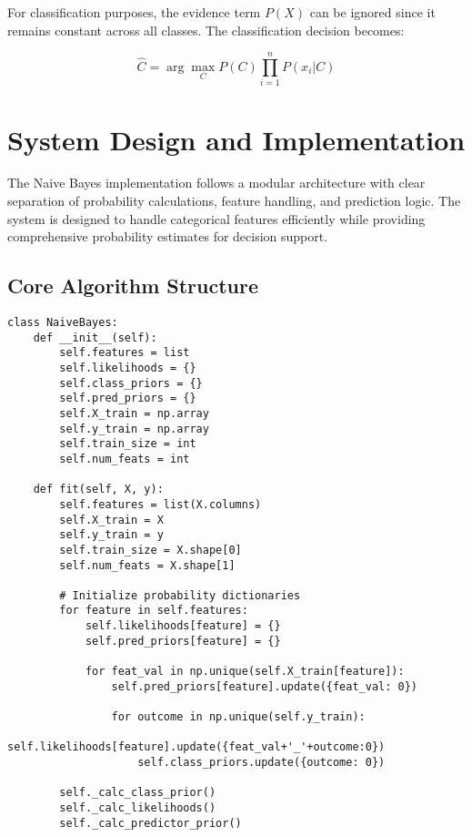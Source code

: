 \documentclass[11pt,a4paper]{article}
\begin{document}
For classification purposes, the evidence term $P(X)$ can be ignored since it remains constant across all classes. The classification decision becomes:

\begin{equation}
\hat{C} = \arg\max_C P(C) \prod_{i=1}^{n} P(x_i|C)
\end{equation}

\section{System Design and Implementation}

The Naive Bayes implementation follows a modular architecture with clear separation of probability calculations, feature handling, and prediction logic. The system is designed to handle categorical features efficiently while providing comprehensive probability estimates for decision support.

\subsection{Core Algorithm Structure}

\begin{lstlisting}[caption=Naive Bayes Class Implementation]
class NaiveBayes:
    def __init__(self):
        self.features = list
        self.likelihoods = {}
        self.class_priors = {}
        self.pred_priors = {}
        self.X_train = np.array
        self.y_train = np.array
        self.train_size = int
        self.num_feats = int

    def fit(self, X, y):
        self.features = list(X.columns)
        self.X_train = X
        self.y_train = y
        self.train_size = X.shape[0]
        self.num_feats = X.shape[1]
        
        # Initialize probability dictionaries
        for feature in self.features:
            self.likelihoods[feature] = {}
            self.pred_priors[feature] = {}
            
            for feat_val in np.unique(self.X_train[feature]):
                self.pred_priors[feature].update({feat_val: 0})
                
                for outcome in np.unique(self.y_train):
                    self.likelihoods[feature].update({feat_val+'_'+outcome:0})
                    self.class_priors.update({outcome: 0})
        
        self._calc_class_prior()
        self._calc_likelihoods()
        self._calc_predictor_prior()
\end{lstlisting}
\end{document}
